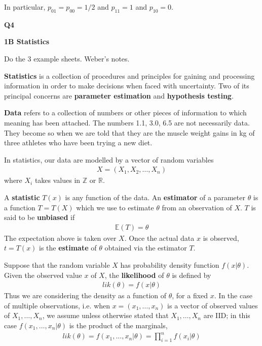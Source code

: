 \documentclass[hidelinks, 12pt]{article}
\theoremstyle{mydefstyle}
\theoremstyle{mythmstyle}
\begin{document}
In particular, $p_{01} = p_{00} = 1/2$ and $p_{11} = 1$ and $p_{10} = 0$. 

\textbf{Q4} 

\textbf{1B Statistics}

Do the 3 example sheets. Weber's notes. 

\textbf{Statistics} is a collection of procedures and principles for gaining and processing information in order to make decisions when faced with uncertainty. Two of its principal concerns are \textbf{parameter estimation} and \textbf{hypothesis testing}. 

\textbf{Data} refers to a collection of numbers or other pieces of information to which meaning has been attached. The numbers 1.1, 3.0, 6.5 are not necessarily data. They become so when we are told that they are the muscle weight gains in kg of three athletes who have been trying a new diet. 

In statistics, our data are modelled by a vector of random variables
\begin{gather*}
X = (X_1, X_2, \dots, X_n)
\end{gather*}
where $X_i$ takes values in $\mathbb{Z}$ or $\mathbb{R}$. 

A \textbf{statistic} $T(x)$ is any function of the data. An \textbf{estimator} of a parameter $\theta$ is a function $T = T(X)$ which we use to estimate $\theta$ from an observation of $X$. $T$ is said to be \textbf{unbiased} if
\begin{gather*}
\mathbb{E}(T) = \theta
\end{gather*}
The expectation above is taken over $X$. Once the actual data $x$ is observed, $t = T(x)$ is the \textbf{estimate} of $\theta$ obtained via the estimator $T$. 

Suppose that the random variable $X$ has probability density function $f(x\vert\theta)$. Given the observed value $x$ of $X$, the \textbf{likelihood} of $\theta$ is defined by
\begin{gather*}
lik(\theta) = f(x\vert\theta)
\end{gather*}
Thus we are considering the density as a function of $\theta$, for a fixed $x$. In the case of multiple observations, i.e. when $x = (x_1, \dots, x_n)$ is a vector of observed values of $X_1, \dots, X_n$, we assume unless otherwise stated that $X_1, \dots, X_n$ are IID; in this case $f(x_1, \dots, x_n \vert \theta)$ is the product of the marginals,
\begin{gather*}
lik(\theta) = f(x_1, \dots, x_n \vert \theta) = \prod_{i=1}^n f(x_i \vert \theta)
\end{gather*}
\end{document}
